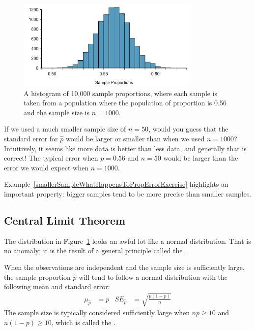 \begin{figure}
   \centering
   \includegraphics[width=0.8\textwidth]{ch_inference_for_props/figures/sampling_10k_prop_56p/sampling_10k_prop_56p}
   \caption{A histogram of 10,000 sample proportions, where each
       sample is taken from a population where the population of
       proportion is 0.56 and the sample size is $n = 1000$.}
   \label{sampling_10k_prop_56p}
\end{figure}

\begin{example}{If we used a much smaller sample size of $n = 50$,
would you guess that the standard error for $\hat{p}$ would be larger
or smaller than when we used $n = 1000$?}
\label{smallerSampleWhatHappensToPropErrorExercise}
Intuitively, it seems like more data is better
than less data, and generally that is correct! The typical error
when $p = 0.56$ and $n = 50$ would be larger
than the error we would expect when $n = 1000$.
\end{example}

\noindent
Example~\ref{smallerSampleWhatHappensToPropErrorExercise}
highlights an important property: bigger samples
tend to be more precise than smaller samples.



\subsection{Central Limit Theorem}

The distribution in
Figure~\ref{sampling_10k_prop_56p} looks an awful lot like
a normal distribution. That is no anomaly; it is the result
of a general principle called the .

\begin{termBox}{
When the observations are independent and the sample size is
sufficiently large, the sample proportion $\hat{p}$ will tend
to follow a normal distribution with the following mean and
standard error:
\begin{align*}
  \mu_{\hat{p}} &= p
  &SE_{\hat{p}} &= \sqrt{\frac{p (1 - p)}{n}}
\end{align*}
The sample size is typically considered sufficiently large when
$np \geq 10$ and $n(1-p) \geq 10$, which is called the
.} %
\end{termBox}

